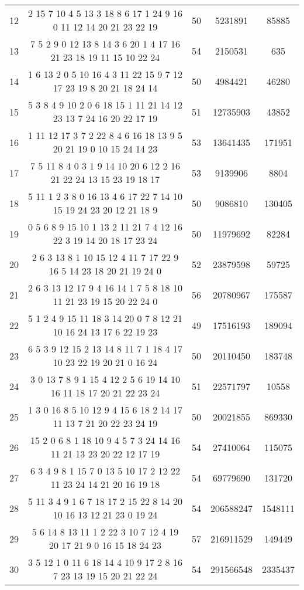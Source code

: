 \documentclass[a4paper,11pt,oneside,openany]{jsbook}
\begin{document}
\begin{table}[]
{\begin{tabular}{|c|c|c|c|c|}
12 & 2 15 7 10 4 5 13 3 18 8 6 17 1 24 9 16 0 11 12 14 20 21 23 22 19  & 50 & 5231891 & 85885 \\
13 & 7 5 2 9 0 12 13 8 14 3 6 20 1 4 17 16 21 23 18 19 11 15 10 22 24  & 54 & 2150531 & 635 \\
14 & 1 6 13 2 0 5 10 16 4 3 11 22 15 9 7 12 17 23 19 8 20 21 18 24 14  & 50 & 4984421 & 46280 \\
15 & 5 3 8 4 9 10 2 0 6 18 15 1 11 21 14 12 23 13 7 24 16 20 22 17 19  & 51 & 12735903 & 43852 \\
16 & 1 11 12 17 3 7 2 22 8 4 6 16 18 13 9 5 20 21 19 0 10 15 24 14 23  & 53 & 13641435 & 171951 \\
17 & 7 5 11 8 4 0 3 1 9 14 10 20 6 12 2 16 21 22 24 13 15 23 19 18 17  & 53 & 9139906 & 8804 \\
18 & 5 11 1 2 3 8 0 16 13 4 6 17 22 7 14 10 15 19 24 23 20 12 21 18 9  & 50 & 9086810 & 130405 \\
19 & 0 5 6 8 9 15 10 1 13 2 11 21 7 4 12 16 22 3 19 14 20 18 17 23 24  & 50 & 11979692 & 82284 \\
20 & 2 6 3 13 8 1 10 15 12 4 11 7 17 22 9 16 5 14 23 18 20 21 19 24 0  & 52 & 23879598 & 59725 \\
21 & 2 6 3 13 12 17 9 4 16 14 1 7 5 8 18 10 11 21 23 19 15 20 22 24 0  & 56 & 20780967 & 175587 \\
22 & 5 1 2 4 9 15 11 18 3 14 20 0 7 8 12 21 10 16 24 13 17 6 22 19 23  & 49 & 17516193 & 189094 \\
23 & 6 5 3 9 12 15 2 13 14 8 11 7 1 18 4 17 10 23 22 19 20 21 0 16 24  & 50 & 20110450 & 183748 \\
24 & 3 0 13 7 8 9 1 15 4 12 2 5 6 19 14 10 16 11 18 17 20 21 22 23 24  & 51 & 22571797 & 10558 \\
25 & 1 3 0 16 8 5 10 12 9 4 15 6 18 2 14 17 11 13 7 21 20 22 23 24 19  & 50 & 20021855 & 869330 \\
26 & 15 2 0 6 8 1 18 10 9 4 5 7 3 24 14 16 11 21 13 23 20 22 12 17 19  & 54 & 27410064 & 115075 \\
27 & 6 3 4 9 8 1 15 7 0 13 5 10 17 2 12 22 11 23 24 14 21 20 16 19 18  & 54 & 69779690 & 131720 \\
28 & 5 11 3 4 9 1 6 7 18 17 2 15 22 8 14 20 10 16 13 12 21 23 0 19 24  & 54 & 206588247 & 1548111 \\
29 & 5 6 14 8 13 11 1 2 22 3 10 7 12 4 19 20 17 21 9 0 16 15 18 24 23  & 57 & 216911529 & 149449 \\
30 & 3 5 12 1 0 11 6 18 14 4 10 9 17 2 8 16 7 23 13 19 15 20 21 22 24  & 54 & 291566548 & 2335437 \\

\end{tabular}}
\end{table}
\end{document}
